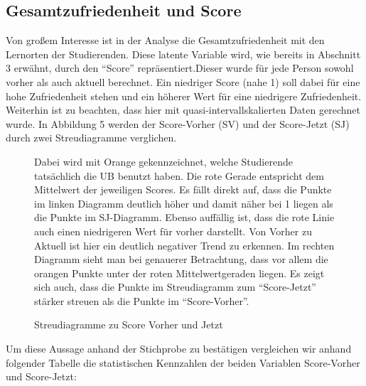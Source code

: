 \documentclass[11pt, a4paper]{article}
\begin{document}
\subsection{Gesamtzufriedenheit und Score}



Von großem Interesse ist in der Analyse die Gesamtzufriedenheit mit den Lernorten der Studierenden.
Diese latente Variable wird, wie bereits in Abschnitt 3 erwähnt, durch den “Score” repräsentiert.Dieser wurde für jede Person sowohl vorher als auch aktuell berechnet.
Ein niedriger Score (nahe 1) soll dabei für eine hohe Zufriedenheit stehen und ein höherer Wert für eine niedrigere Zufriedenheit.\\
Weiterhin ist zu beachten, dass hier mit quasi-intervallskalierten Daten gerechnet wurde.
In Abbildung 5 werden der Score-Vorher (SV) und der Score-Jetzt (SJ) durch zwei Streudiagramme verglichen.

\vspace{-0.5cm}
\begin{figure}[h]
{\centering 
\vspace{-1.8cm}
\caption{Streudiagramme zu Score Vorher und Jetzt}}
\vspace{1cm}
Dabei wird mit Orange gekennzeichnet, welche Studierende tatsächlich die UB benutzt haben. Die rote Gerade entspricht dem Mittelwert der jeweiligen Scores.
Es fällt direkt auf, dass die Punkte im linken Diagramm deutlich höher und damit näher bei 1 liegen als die Punkte im SJ-Diagramm.
Ebenso auffällig ist, dass die rote Linie auch einen niedrigeren Wert für vorher darstellt.
Von Vorher zu Aktuell ist hier ein deutlich negativer Trend zu erkennen.
Im rechten Diagramm sieht man bei genauerer Betrachtung, dass vor allem die orangen Punkte unter der roten Mittelwertgeraden liegen.
Es zeigt sich auch, dass die Punkte im Streudiagramm zum “Score-Jetzt” stärker streuen als die Punkte im “Score-Vorher”.


\end{figure}
\newpage
Um diese Aussage anhand der Stichprobe zu bestätigen vergleichen wir anhand folgender Tabelle die statistischen Kennzahlen der beiden Variablen Score-Vorher und Score-Jetzt: 
\end{document}
